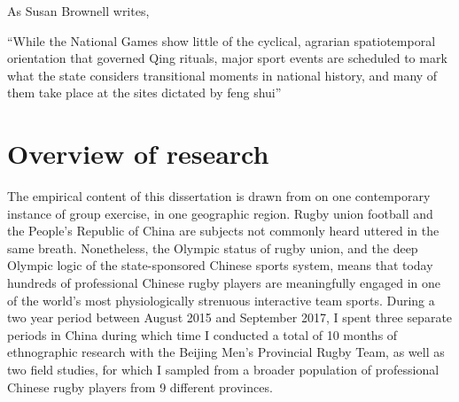 As Susan Brownell writes,

``While the National Games show little of the cyclical, agrarian spatiotemporal orientation that governed Qing rituals, major sport events are scheduled to mark what the state considers transitional moments in national history, and many of them take place at the sites dictated by feng shui'' \citep[88]{Brownel2008}








































\section{Overview of research}
The empirical content of this dissertation is drawn from on one contemporary instance of group exercise, in one geographic region.  Rugby union football and the People's Republic of China are subjects not commonly heard uttered in the same breath.  Nonetheless, the Olympic status of rugby union, and the deep Olympic logic of the state-sponsored Chinese sports system, means that today hundreds of professional Chinese rugby players are meaningfully engaged in one of the world's most physiologically strenuous interactive team sports.  During a two year period between August 2015 and September 2017, I spent three separate periods in China during which time I conducted a total of 10 months of ethnographic research with the Beijing Men's Provincial Rugby Team, as well as two field studies, for which I sampled from a broader population of professional Chinese rugby players from 9 different provinces.

